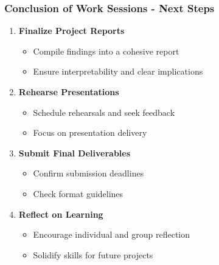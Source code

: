 \documentclass[aspectratio=169]{beamer}
\begin{document}
\begin{frame}[fragile]
    \frametitle{Conclusion of Work Sessions - Next Steps}

    \begin{enumerate}
        \item \textbf{Finalize Project Reports}
        \begin{itemize}
            \item Compile findings into a cohesive report
            \item Ensure interpretability and clear implications
        \end{itemize}
        
        \item \textbf{Rehearse Presentations}
        \begin{itemize}
            \item Schedule rehearsals and seek feedback
            \item Focus on presentation delivery
        \end{itemize}
        
        \item \textbf{Submit Final Deliverables}
        \begin{itemize}
            \item Confirm submission deadlines
            \item Check format guidelines
        \end{itemize}
        
        \item \textbf{Reflect on Learning}
        \begin{itemize}
            \item Encourage individual and group reflection
            \item Solidify skills for future projects
        \end{itemize}
    \end{enumerate}
\end{frame}
\end{document}
